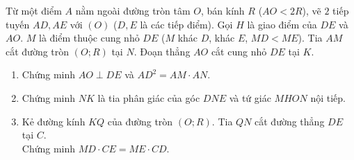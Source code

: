 \begin{ex}%
	Từ một điểm $A$ nằm ngoài đường tròn tâm $O$, bán kính $R$ ($AO<2R$), vẽ $2$ tiếp tuyến $AD,AE$ với $(O)$ ($D,E$ là các tiếp điểm). Gọi $H$ là giao điểm của $DE$ và $AO$. $M$ là điểm thuộc cung nhỏ $DE$ ($M$ khác $D$, khác $E$, $MD<ME$). Tia $AM$ cắt đường tròn $(O;R)$ tại $N$. Đoạn thẳng $AO$ cắt cung nhỏ $DE$ tại $K$.
	\begin{enumerate}
		\item Chứng minh $AO \perp DE$ và $AD^2=AM \cdot AN$.
		\item Chứng minh $NK$ là tia phân giác của góc $DNE$ và tứ giác $MHON$ nội tiếp.
		\item Kẻ đường kính $KQ$ của đường tròn $(O;R)$. Tia $QN$ cắt đường thẳng $DE$ tại $C$.\\
		Chứng minh $MD \cdot CE=ME \cdot CD$.
	\end{enumerate}
\end{ex}
